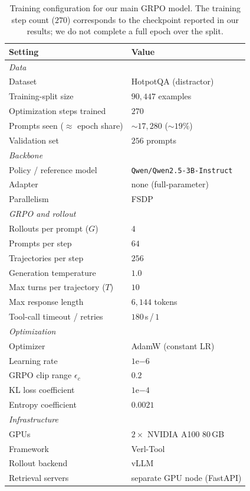 \documentclass[11pt]{article}
\begin{document}
\begin{table}[h]
\centering
\small
\setlength{\tabcolsep}{6pt}
\renewcommand{\arraystretch}{1.1}
\begin{tabular}{p{3cm}p{3.5cm}}
\toprule
\textbf{Setting} & \textbf{Value} \\
\midrule
\multicolumn{2}{l}{\emph{Data}} \\
Dataset                       & HotpotQA (distractor) \\
Training-split size           & $90{,}447$ examples \\
Optimization steps trained    & $270$ \\
Prompts seen ($\approx$ epoch share) & $\sim\!17{,}280$ ($\sim\!19\%$) \\
Validation set                & $256$ prompts \\
\midrule
\multicolumn{2}{l}{\emph{Backbone}} \\
Policy / reference model      & \texttt{Qwen/Qwen2.5-3B-Instruct} \\
Adapter                       & none (full-parameter) \\
Parallelism                   & FSDP~\citep{zhao2023pytorch} \\
\midrule
\multicolumn{2}{l}{\emph{GRPO and rollout}} \\
Rollouts per prompt ($G$)     & $4$ \\
Prompts per step              & $64$ \\
Trajectories per step         & $256$ \\
Generation temperature        & $1.0$ \\
Max turns per trajectory ($T$)        & $10$ \\
Max response length           & $6{,}144$ tokens \\
Tool-call timeout / retries   & $180$\,s\,/\,$1$ \\
\midrule
\multicolumn{2}{l}{\emph{Optimization}} \\
Optimizer                     & AdamW (constant LR) \\
Learning rate                 & $1\mathrm{e}{-6}$ \\
GRPO clip range $\epsilon_c$  & $0.2$ \\
KL loss coefficient           & $1\mathrm{e}{-4}$ \\
Entropy coefficient           & $0.0021$ \\
\midrule
\multicolumn{2}{l}{\emph{Infrastructure}} \\
GPUs                          & $2\times$ NVIDIA A100 80\,GB \\
Framework                     & Verl-Tool~\citep{jiang2025verltool} \\
Rollout backend               & vLLM \\
Retrieval servers             & separate GPU node (FastAPI) \\
\bottomrule
\end{tabular}
\caption{Training configuration for our main GRPO model. The training step count ($270$) corresponds to the checkpoint reported in our results; we do not complete a full epoch over the split.}
\label{tab:train-config}
\end{table}
\end{document}
